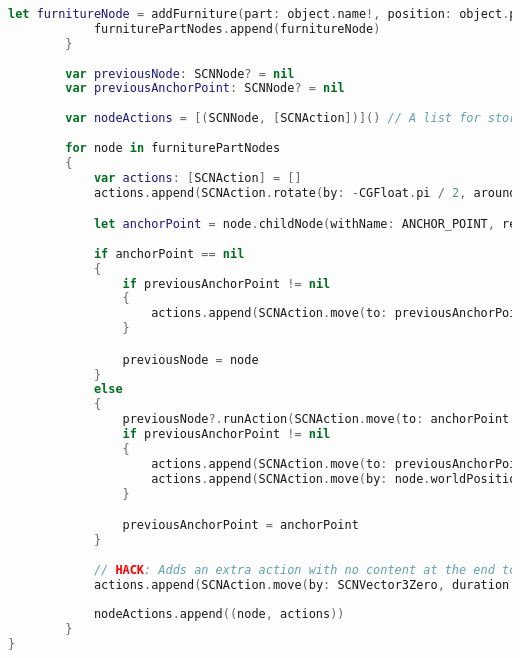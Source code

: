 \begin{appendices}
\begin{lstlisting}[language=swift]
            let furnitureNode = addFurniture(part: object.name!, position: object.position!)
            furniturePartNodes.append(furnitureNode)
        }
        
        var previousNode: SCNNode? = nil
        var previousAnchorPoint: SCNNode? = nil
        
        var nodeActions = [(SCNNode, [SCNAction])]() // A list for storing animations to run on a node later
        
        for node in furniturePartNodes
        {
            var actions: [SCNAction] = []
            actions.append(SCNAction.rotate(by: -CGFloat.pi / 2, around: SCNVector3(0, 0, 1), duration: 1))

            let anchorPoint = node.childNode(withName: ANCHOR_POINT, recursively: true)
            
            if anchorPoint == nil
            {
                if previousAnchorPoint != nil
                {
                    actions.append(SCNAction.move(to: previousAnchorPoint!.worldPosition, duration: 2))
                }

                previousNode = node
            }
            else
            {
                previousNode?.runAction(SCNAction.move(to: anchorPoint!.worldPosition, duration: 2))
                if previousAnchorPoint != nil
                {
                    actions.append(SCNAction.move(to: previousAnchorPoint!.worldPosition, duration: 2))
                    actions.append(SCNAction.move(by: node.worldPosition.substract(other: anchorPoint!.worldPosition), duration: 2))
                }

                previousAnchorPoint = anchorPoint
            }
            
            // HACK: Adds an extra action with no content at the end to make completion handler wait until the last action is done
            actions.append(SCNAction.move(by: SCNVector3Zero, duration: 1))
            
            nodeActions.append((node, actions))
        }
}
\end{lstlisting}

\end{appendices}
